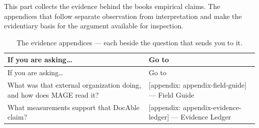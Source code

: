 

This part collects the evidence behind the book\textquotesingle s empirical claims. The appendices that follow separate observation from interpretation and make the evidentiary basis for the argument available for inspection.

{\footnotesize
\begin{longtable}[]{@{}
  >{\raggedright\arraybackslash}p{}
  >{\raggedright\arraybackslash}p{}@{}}
\caption[The evidence appendices and the questions they answer]{The evidence appendices --- each beside the question that sends you to it.}\label{where-to-look-evidence}\tabularnewline
\toprule\noalign{}
\begin{minipage}[b]{\linewidth}\raggedright
If you are asking\ldots{}
\end{minipage} & \begin{minipage}[b]{\linewidth}\raggedright
Go to
\end{minipage} \\
\midrule\noalign{}
\endfirsthead
\toprule\noalign{}
\begin{minipage}[b]{\linewidth}\raggedright
If you are asking\ldots{}
\end{minipage} & \begin{minipage}[b]{\linewidth}\raggedright
Go to
\end{minipage} \\
\midrule\noalign{}
\endhead
\bottomrule\noalign{}
\endlastfoot
What was that external organization doing, and how does MAGE read it? & {[}appendix: appendix-field-guide{]} --- Field Guide \\
What measurements support that DocAble claim? & {[}appendix: appendix-evidence-ledger{]} --- Evidence Ledger \\
\end{longtable}
}
